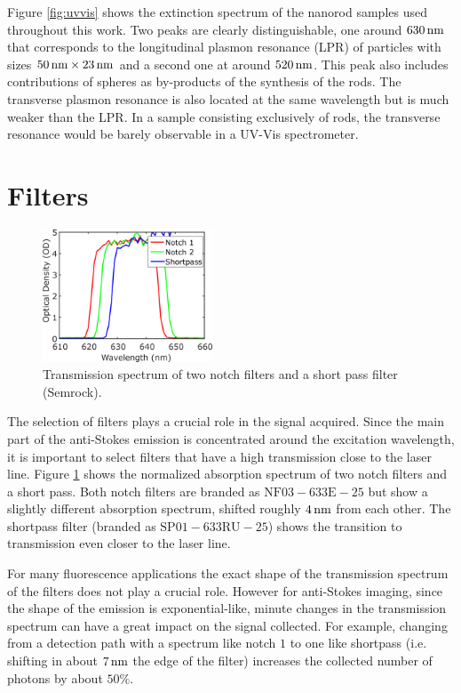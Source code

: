  Figure \ref{fig:uvvis} shows the extinction spectrum of the nanorod samples
 used throughout this work. Two peaks are clearly distinguishable, one around
 $630\,\textrm{nm}$ that corresponds to the longitudinal plasmon resonance (LPR) of
 particles with sizes $50\,\textrm{nm}\times23\,\textrm{nm}$ and a second one at around $520\,\textrm{nm}$.
 This peak also includes contributions of spheres as by-products of the
 synthesis of the rods. The transverse plasmon resonance is also located at the
 same wavelength but is much weaker than the LPR. In a sample consisting exclusively of rods, the transverse resonance would be barely observable in a UV-Vis
 spectrometer.
 
 \section{Filters}

\begin{figure}[htp]
 \centering
 \includegraphics[width=0.45\textwidth]{Chapters/03_Background_Free/Figures/Supplementary/03_Filters/filters.png}
 \caption{Transmission spectrum of two notch filters and a short pass
 filter (Semrock).}
 \label{fig:filters}
 \end{figure}
 
The selection of filters plays a crucial role in the signal acquired. Since the
main part of the anti-Stokes emission is concentrated around the excitation
wavelength, it is important to select filters that have a high transmission
close to the laser line. Figure \ref{fig:filters} shows the normalized
absorption spectrum of two notch filters and a short pass. Both notch filters are
branded as $\textrm{NF}03-633\textrm{E}-25$ but show a slightly different
absorption spectrum, shifted roughly $4\,\textrm{nm}$ from each other. The shortpass
filter (branded as $\textrm{SP}01-633\textrm{RU}-25$) shows the transition to
transmission even closer to the laser line. 

For many fluorescence applications the exact shape of the transmission
spectrum of the filters does not play a crucial role. However for anti-Stokes
imaging, since the shape of the emission is exponential-like, minute
changes in the transmission spectrum can have a great impact on the signal collected. For example, changing from
a detection path with a spectrum like notch $1$ to one like shortpass (i.e.
shifting in about $7\,\textrm{nm}$ the edge of the filter) increases the collected number
of photons by about $50\%$. 

